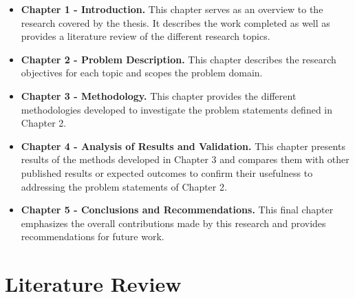 \begin{itemize}

\item \textbf{Chapter 1 - Introduction.} This chapter serves as an overview to the research covered by the thesis. It describes the work completed as well as provides a literature review of the different research topics.

\item \textbf{Chapter 2 - Problem Description.} This chapter describes the research objectives for each topic and scopes the problem domain.

\item \textbf{Chapter 3 - Methodology.} This chapter provides the different methodologies developed to investigate the problem statements defined in Chapter 2.

\item \textbf{Chapter 4 - Analysis of Results and Validation.} This chapter presents results of the methods developed in Chapter 3 and compares them with other published results or expected outcomes to confirm their usefulness to addressing the problem statements of Chapter 2.

\item \textbf{Chapter 5 - Conclusions and Recommendations.} This final chapter emphasizes the overall contributions made by this research and provides recommendations for future work.

\end{itemize}
\section{Literature Review}

